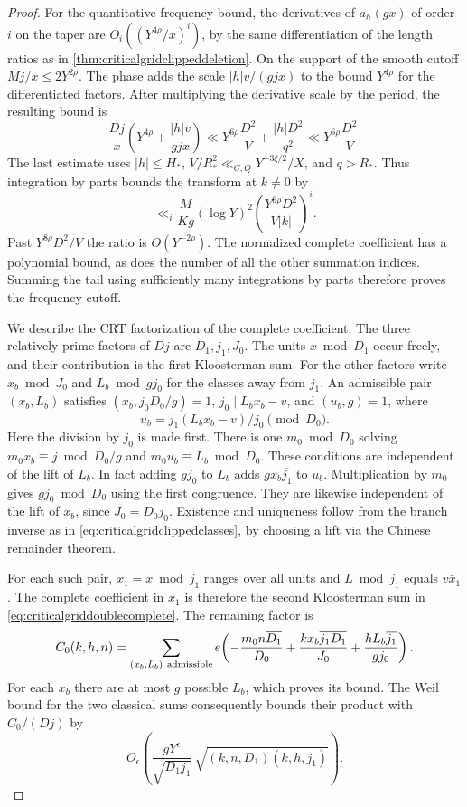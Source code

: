 \documentclass[11pt,a4paper]{article}
\numberwithin{equation}{section}
\begin{document}
\begin{proof}
For the quantitative frequency bound, the derivatives of
$a_h(gx)$ of order $i$ on the taper are
$O_i((Y^{4\rho}/x)^i)$, by the same differentiation of the
length ratios as in \cref{thm:criticalgridclippeddeletion}.
On the support of the smooth cutoff $Mj/x\le2Y^{2\rho}$.
The phase adds the scale $|h|v/(g jx)$ to the bound
$Y^{4\rho}$ for the differentiated factors.
After multiplying the derivative scale by the period,
the resulting bound is
\[
 \frac{Dj}{x}\left(Y^{4\rho}+\frac{|h|v}{g jx}\right)
 \ll Y^{6\rho}\frac{D^2}{V}+\frac{|h|D^2}{q^2}
 \ll Y^{6\rho}\frac{D^2}{V}.
\]
The last estimate uses $|h|\le H_*$,
$V/R_*^2\ll_{C,Q}Y^{-3\xi/2}/X$, and $q>R_*$.
Thus integration by parts bounds the transform at $k\ne0$
by
\[
 \ll_i \frac{M}{K g}(\log Y)^2
                  \left(\frac{Y^{6\rho}D^2}{V|k|}\right)^i .
\]
Past $Y^{8\rho}D^2/V$ the ratio is $O(Y^{-2\rho})$.
The normalized complete coefficient has a polynomial
bound, as does the number of all the other summation
indices. Summing the tail using sufficiently many
integrations by parts therefore proves the frequency cutoff.

We describe the CRT factorization of the complete coefficient.
The three relatively prime factors of $Dj$ are
$D_1,j_1,J_0$. The units $x\bmod D_1$ occur freely,
and their contribution is the first Kloosterman sum.
For the other factors write $x_b\bmod J_0$ and
$L_b\bmod g j_0$ for the classes away from $j_1$.
An admissible pair $(x_b,L_b)$ satisfies
$(x_b,j_0D_0/g)=1$, $j_0\mid L_bx_b-v$, and
$(u_b,g)=1$, where
\[
 u_b=\overline{j_1}(L_bx_b-v)/j_0\pmod{D_0}.
\]
Here the division by $j_0$ is made first.
There is one $m_0\bmod D_0$ solving
$m_0 x_b\equiv j\bmod D_0/g$ and
$m_0 u_b\equiv L_b\bmod D_0$.
These conditions are independent of the lift of $L_b$.
In fact adding $g j_0$ to $L_b$ adds
$g x_b\overline{j_1}$ to $u_b$. Multiplication by $m_0$
gives $g j_0\bmod D_0$ using the first congruence.
They are likewise independent of the lift of $x_b$,
since $J_0=D_0j_0$. Existence and uniqueness follow
from the branch inverse as in \cref{eq:criticalgridclippedclasses},
by choosing a lift via the Chinese remainder theorem.

For each such pair, $x_1=x\bmod j_1$ ranges over all units
and $L\bmod j_1$ equals $v\bar x_1$.
The complete coefficient in $x_1$ is therefore the
second Kloosterman sum in \cref{eq:criticalgriddoublecomplete}.
The remaining factor is
\begin{equation}
 C_0(k,h,n)=\sum_{(x_b,L_b)\ {\rm admissible}}
 e\!\left(-\frac{m_0 n\overline{D_1}}{D_0}
          +\frac{k x_b\overline{j_1D_1}}{J_0}
          +\frac{h L_b\overline{j_1}}{g j_0}\right).
 \label{eq:criticalgriddoublecompletebad}
\end{equation}
For each $x_b$ there are at most $g$ possible $L_b$,
which proves its bound.
The Weil bound for the two classical sums
\cite[(9.6)]{KnightlyLiKuznetsov} consequently bounds
their product with $C_0/(Dj)$ by
\[
 O_\epsilon\!\left(
    \frac{gY^\epsilon}{\sqrt{D_1 j_1}}\,
      \sqrt{(k,n,D_1)(k,h,j_1)}
 \right).
\]


\end{proof}
\end{document}

